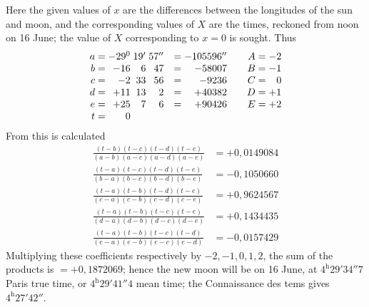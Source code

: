 Here the given values of \(x\) are the differences between the longitudes of the sun and moon, and the corresponding values of \(X\) are the times, reckoned from noon on 16 June; the value of \(X\) corresponding to \(x=0\) is sought. Thus
\[
\begin{array}{r@{\;}c@{\;}r@{\;}r@{\;}r@{\quad}c@{\;}r@{\qquad}r@{\;}c@{\;}r}
a&=&-29^{0}&19'&57''&=&-105596''&A&=&-2\\
b&=&-16&6&47&=&-58007&B&=&-1\\
c&=&-2&33&56&=&-9236&C&=&0\\
d&=&+11&13&2&=&+40382&D&=&+1\\
e&=&+25&7&6&=&+90426&E&=&+2\\
t&=&0&&&&&&&
\end{array}
\]
From this is calculated
\[
\begin{aligned}
\frac{(t-b)(t-c)(t-d)(t-e)}{(a-b)(a-c)(a-d)(a-e)}&=+0{,}0149084\\[5pt]
\frac{(t-a)(t-c)(t-d)(t-e)}{(b-a)(b-c)(b-d)(b-e)}&=-0{,}1050660\\[5pt]
\frac{(t-a)(t-b)(t-d)(t-e)}{(c-a)(c-b)(c-d)(c-e)}&=+0{,}9624567\\[5pt]
\frac{(t-a)(t-b)(t-c)(t-e)}{(d-a)(d-b)(d-c)(d-e)}&=+0{,}1434435\\[5pt]
\frac{(t-a)(t-b)(t-c)(t-d)}{(e-a)(e-b)(e-c)(e-d)}&=-0{,}0157429
\end{aligned}
\]
Multiplying these coefficients respectively by \(-2,-1,0,1,2\), the sum of the products
is \(=+0{,}1872069\); hence the new moon will be on 16 June, at \(4^{\mathrm h}29'34''7\) Paris true
time, or \(4^{\mathrm h}29'41''4\) mean time; the Connaissance des tems gives \(4^{\mathrm h}27'42''\).

